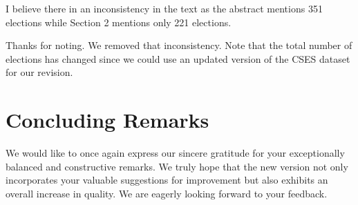 \documentclass[a4paper, 12pt]{scrartcl}
\theoremstyle{break}
\newenvironment{changes}{\par\color{violet}\par\addvspace{\baselineskip}}{\par\addvspace{\baselineskip}}
\begin{document}
\begin{changes}
I believe there in an inconsistency in the text as the abstract mentions 351 elections while Section 2 mentions only 221 elections.
\end{changes}

Thanks for noting. We removed that inconsistency. Note that the total number of elections has changed since we could use an updated version of the CSES dataset for our revision.


\newpage
\section*{Concluding Remarks}

We would like to once again express our sincere gratitude for your exceptionally balanced and constructive remarks. We truly hope that the new version not only incorporates your valuable suggestions for improvement but also exhibits an overall increase in quality. We are eagerly looking forward to your feedback.



\end{document}
